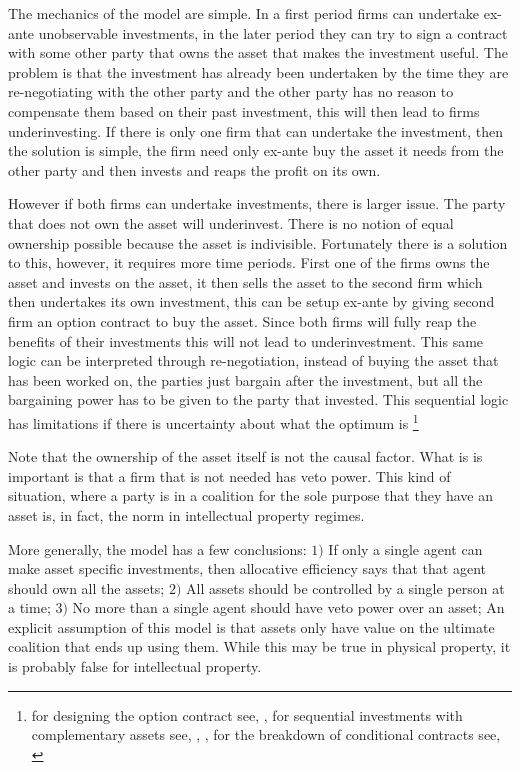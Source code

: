 \documentclass[12pt]{article}
\numberwithin{equation}{section}
\begin{document}
The mechanics of the model are simple. In a first period firms can undertake ex-ante unobservable investments, in the later period they can try to sign a contract with some other party that owns the asset that makes the investment useful. The problem is that the investment has already been undertaken by the time they are re-negotiating with the other party and the other party has no reason to compensate them based on their past investment, this will then lead to firms underinvesting. If there is only one firm that can undertake the investment, then the solution is simple, the firm need only ex-ante buy the asset it needs from the other party and then invests and reaps the profit on its own. 

However if both firms can undertake investments, there is larger issue. The party that does not own the asset will underinvest. There is no notion of equal ownership possible because the asset is indivisible. Fortunately there is a solution to this, however, it requires more time periods. First one of the firms owns the asset and invests on the asset, it then sells the asset to the second firm which then undertakes its own investment, this can be setup ex-ante by giving second firm an option contract to buy the asset. Since both firms will fully reap the benefits of their investments this will not lead to underinvestment. This same logic can be interpreted through re-negotiation, instead of buying the asset that has been worked on, the parties just bargain after the investment, but all the bargaining power has to be given to the party that invested. This sequential logic has limitations if there is uncertainty about what the optimum is \footnote{for designing the option contract see, \cite{Noldeke1998}, for sequential investments with complementary assets see, \cite{Zhang2014},\cite{bessen2009sequential} , for the breakdown of conditional contracts see, \cite{Maskin1999}} 

Note that the ownership of the asset itself is not the causal factor. What is is important is that a firm that is not needed has veto power. This kind of situation, where a party is in a coalition for the sole purpose that they have an asset is, in fact, the norm in intellectual property regimes. 

More generally, the model has a few conclusions: $1)$ If only a single agent can make asset specific investments, then allocative efficiency says that that agent should own all the assets; $2)$ All assets should be controlled by a single person at a time; $3)$ No more than a single agent should have veto power over an asset; An explicit assumption of this model is that assets only have value on the ultimate coalition that ends up using them. While this may be true in physical property, it is probably false for intellectual property. 
\end{document}
